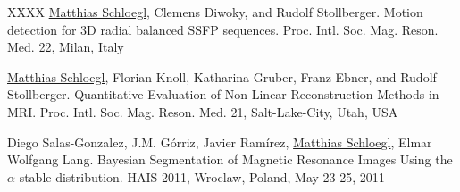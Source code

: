 \begin{thebibliography}{XXXX}
	\newblock \underline{Matthias Schloegl}, Clemens Diwoky, and Rudolf Stollberger.
	\newblock Motion detection for 3D radial balanced SSFP sequences.
	\newblock Proc. Intl. Soc. Mag. Reson. Med. 22, Milan, Italy

	\newblock \underline{Matthias Schloegl}, Florian Knoll, Katharina Gruber, Franz Ebner, and Rudolf Stollberger. 
	\newblock Quantitative Evaluation of Non-Linear Reconstruction Methods in MRI. 
	\newblock Proc. Intl. Soc. Mag. Reson. Med. 21, Salt-Lake-City, Utah, USA

	\newblock Diego Salas-Gonzalez, J.M. G\'orriz, Javier Ram\'irez, \underline{Matthias Schloegl}, Elmar Wolfgang Lang.
	\newblock Bayesian Segmentation of Magnetic Resonance Images Using the $\alpha$-stable distribution.
	\newblock HAIS 2011, Wroclaw, Poland, May 23-25, 2011
	 

\end{thebibliography}
